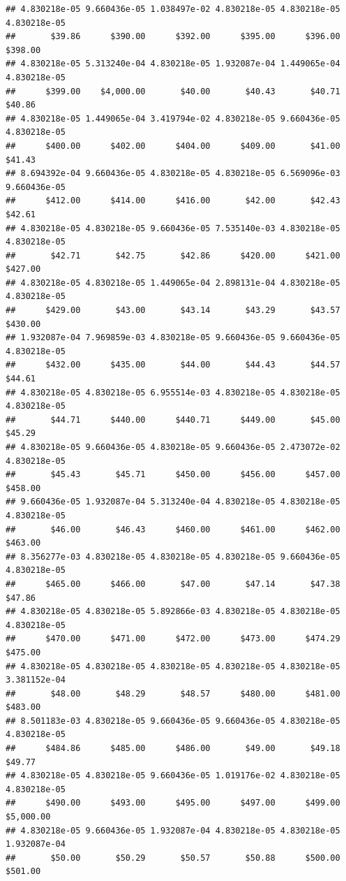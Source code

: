 \begin{verbatim}
## 4.830218e-05 9.660436e-05 1.038497e-02 4.830218e-05 4.830218e-05 4.830218e-05 
##       $39.86      $390.00      $392.00      $395.00      $396.00      $398.00 
## 4.830218e-05 5.313240e-04 4.830218e-05 1.932087e-04 1.449065e-04 4.830218e-05 
##      $399.00    $4,000.00       $40.00       $40.43       $40.71       $40.86 
## 4.830218e-05 1.449065e-04 3.419794e-02 4.830218e-05 9.660436e-05 4.830218e-05 
##      $400.00      $402.00      $404.00      $409.00       $41.00       $41.43 
## 8.694392e-04 9.660436e-05 4.830218e-05 4.830218e-05 6.569096e-03 9.660436e-05 
##      $412.00      $414.00      $416.00       $42.00       $42.43       $42.61 
## 4.830218e-05 4.830218e-05 9.660436e-05 7.535140e-03 4.830218e-05 4.830218e-05 
##       $42.71       $42.75       $42.86      $420.00      $421.00      $427.00 
## 4.830218e-05 4.830218e-05 1.449065e-04 2.898131e-04 4.830218e-05 4.830218e-05 
##      $429.00       $43.00       $43.14       $43.29       $43.57      $430.00 
## 1.932087e-04 7.969859e-03 4.830218e-05 9.660436e-05 9.660436e-05 4.830218e-05 
##      $432.00      $435.00       $44.00       $44.43       $44.57       $44.61 
## 4.830218e-05 4.830218e-05 6.955514e-03 4.830218e-05 4.830218e-05 4.830218e-05 
##       $44.71      $440.00      $440.71      $449.00       $45.00       $45.29 
## 4.830218e-05 9.660436e-05 4.830218e-05 9.660436e-05 2.473072e-02 4.830218e-05 
##       $45.43       $45.71      $450.00      $456.00      $457.00      $458.00 
## 9.660436e-05 1.932087e-04 5.313240e-04 4.830218e-05 4.830218e-05 4.830218e-05 
##       $46.00       $46.43      $460.00      $461.00      $462.00      $463.00 
## 8.356277e-03 4.830218e-05 4.830218e-05 4.830218e-05 9.660436e-05 4.830218e-05 
##      $465.00      $466.00       $47.00       $47.14       $47.38       $47.86 
## 4.830218e-05 4.830218e-05 5.892866e-03 4.830218e-05 4.830218e-05 4.830218e-05 
##      $470.00      $471.00      $472.00      $473.00      $474.29      $475.00 
## 4.830218e-05 4.830218e-05 4.830218e-05 4.830218e-05 4.830218e-05 3.381152e-04 
##       $48.00       $48.29       $48.57      $480.00      $481.00      $483.00 
## 8.501183e-03 4.830218e-05 9.660436e-05 9.660436e-05 4.830218e-05 4.830218e-05 
##      $484.86      $485.00      $486.00       $49.00       $49.18       $49.77 
## 4.830218e-05 4.830218e-05 9.660436e-05 1.019176e-02 4.830218e-05 4.830218e-05 
##      $490.00      $493.00      $495.00      $497.00      $499.00    $5,000.00 
## 4.830218e-05 9.660436e-05 1.932087e-04 4.830218e-05 4.830218e-05 1.932087e-04 
##       $50.00       $50.29       $50.57       $50.88      $500.00      $501.00 

\end{verbatim}
